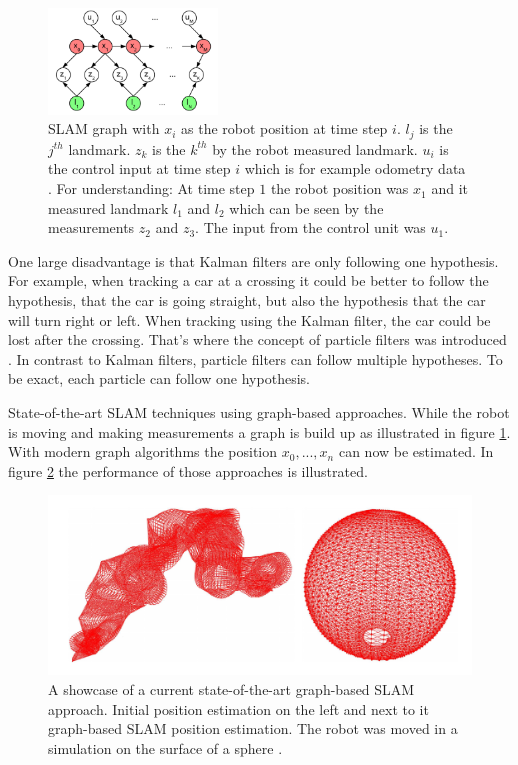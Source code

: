 \begin{figure}[h!]
	\centering
	\includegraphics[width=0.4\textwidth]{images/kaess_slam_graph.png}
	\caption{
		SLAM graph with $x_i$ as the robot position at time step $i$. $l_j$ is the $j^{th}$ landmark. $z_k$ is the $k^{th}$ by the robot measured landmark. $u_i$ is the control input at time step $i$ which is for example odometry data \cite{kaess_isam:_2008}. For understanding: At time step $1$ the robot position was $x_1$ and it measured landmark $l_1$ and $l_2$ which can be seen by the measurements $z_2$ and $z_3$. The input from the control unit was $u_1$.
	}
	\label{fig:kaess_slam_graph}
\end{figure}

One large disadvantage is that Kalman filters are only following one hypothesis. For example, when tracking a car at a crossing it could be better to follow the hypothesis, that the car is going straight, but also the hypothesis that the car will turn right or left. When tracking using the Kalman filter, the car could be lost after the crossing. That's where the concept of particle filters was introduced \cite{qun_particle_filter}. In contrast to Kalman filters, particle filters can follow multiple hypotheses. To be exact, each particle can follow one hypothesis.

State-of-the-art SLAM techniques using graph-based approaches. While the robot is moving and making measurements a graph is build up as illustrated in figure \ref{fig:kaess_slam_graph}. With modern graph algorithms the position $x_0, ... , x_n$ can now be estimated. In figure \ref{fig:grisetti_slam_showcase} the performance of those approaches is illustrated.

\begin{figure}[h!]
	\centering
	\includegraphics[width=\textwidth]{images/grisetti_slam_showcase.png}
	\caption{
		A showcase of a current state-of-the-art graph-based SLAM approach. Initial position estimation on the left and next to it graph-based SLAM position estimation. The robot was moved in a simulation on the surface of a sphere \cite{grisetti_tutorial_2010}.
	}
	\label{fig:grisetti_slam_showcase}
\end{figure}

